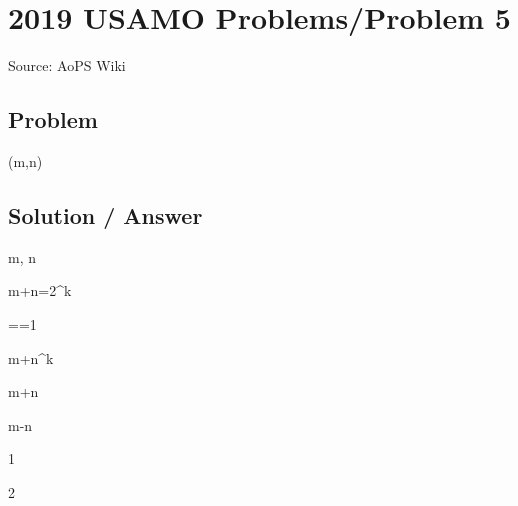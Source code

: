 \documentclass[12pt]{article}
\begin{document}
\section*{2019 USAMO Problems/Problem 5}
Source: AoPS Wiki

\subsection*{Problem}




(m,n)

\subsection*{Solution / Answer}
m, n

m+n=2^k

==1

m+n^k

m+n

m\equiv -n

\equiv {}



1

2
\end{document}
